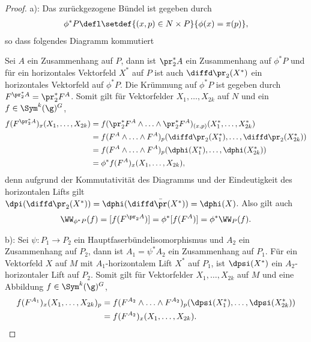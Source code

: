 \documentclass[%
	paper=a5,%
	fleqn,%
	DIV=18,%
	BCOR=0mm,
	fontsize=11pt,
	titlepage=false,%
	bibliography=totoc,
	DIV=18,%
	twoside=true,
	pdftitle=Riemannsche Geometrie,
	pdfauthor=Uwe Semmelmann,
	numbers=noendperiod]%
	{scrbook}
\begin{document}
\begin{proof}
a): 
Das zurückgezogene Bündel ist gegeben durch
\begin{align*}
\phi^*P \defl \setdef{(x,p)\in N\times P}{\phi(x) = \pi(p)},
\end{align*}
so dass folgendes Diagramm kommutiert

{

\centering


}

Sei $A$ ein Zusammenhang auf $P$, dann ist $\pr_2^*A$ ein
Zusammenhang auf $\phi^*P$ und für ein horizontales Vektorfeld $X^*$ auf $P$
ist auch $\diffd \pr_2(X^*)$ ein horizontales Vektorfeld auf $\phi^*P$. Die
Krümmung auf $\phi^*P$ ist gegeben durch $F^{\pr_2^* A} = \pr_2^*
F^A$. Somit gilt für Vektorfelder $X_1,\ldots,X_{2k}$ auf $N$ und ein
$f\in \Sym^k(\g)^G$,
\begin{align*}
f(F^{\pr_2^*A})_x(X_1,\ldots,X_{2k})
&= 
f(\pr_2^* F^A \wedge \ldots\wedge \pr_2^* F^A)_{(x,p)}(X_1^*,\ldots,X_{2k}^*)\\
&= 
f(F^A \wedge \ldots\wedge
F^A)_{p}(\diffd\pr_2(X_1^*),\ldots,\diffd\pr_2(X_{2k}^*)) \\
&= f(F^A \wedge
\ldots\wedge F^A)_{p}(\dphi(X_1^*),\ldots,\dphi(X_{2k}^*)) \\
&= \phi^*
f(F^A)_x(X_1,\ldots,X_{2k}),
\end{align*}
denn aufgrund der Kommutativität des Diagramms und der Eindeutigkeit des
horizontalen Lifts gilt $\dpi(\diffd\pr_2(X^*)) = \dphi(\diffd\bar{\pr}(X^*)) =
\dphi(X)$. Also gilt auch
\begin{align*}
\WW_{\phi^*P}(f) = [f(F^{\pr_2 A})] = \phi^*[f(F^A)]
= \phi^* \WW_{P}(f).
\end{align*}

b): Sei $\psi: P_1\to P_2$ ein Hauptfaserbündelisomorphismus und $A_2$ ein
Zusammenhang auf $P_2$, dann ist $A_1=\psi^* A_2$ ein Zusammenhang auf $P_1$.
Für ein Vektorfeld $X$ auf $M$ mit $A_1$-horizontalem Lift $X^*$ auf $P_1$, ist
$\dpsi(X^*)$ ein $A_2$-horizontaler Lift auf $P_2$. Somit gilt für Vektorfelder
$X_1,\ldots,X_{2k}$ auf $M$ und eine Abbildung $f\in \Sym^k(\g)^G$,
\begin{align*}
f(F^{A_1})_x(X_1,\ldots,X_{2k})_p
&= f(F^{A_2}\wedge \ldots \wedge
F^{A_2})_p(\dpsi(X_1^*),\ldots,\dpsi(X_{2k}^*))\\ 
&= f(F^{A_2})_{x}(X_1,\ldots,X_{2k}).
\end{align*}


\end{proof}
\end{document}
